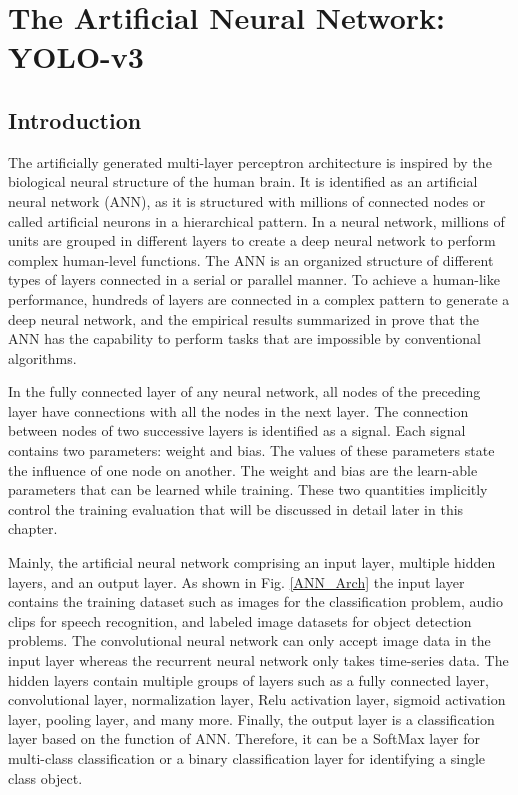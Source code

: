 \chapter{The Artificial Neural Network: YOLO-v3}
\label{ch:The Artificial Neural Network: YOLO-v3}

\section{Introduction}
The artificially generated multi-layer perceptron architecture is inspired by the biological neural structure of the human brain. It is identified as an artificial neural network (ANN), as it is structured with millions of connected nodes or called artificial neurons in a hierarchical pattern. In a neural network, millions of units are grouped in different layers to create a deep neural network to perform complex human-level functions. The ANN is an organized structure of different types of layers connected in a serial or parallel manner. To achieve a human-like performance, hundreds of layers are connected in a complex pattern to generate a deep neural network, and the empirical results summarized in \cite{goodfellow} prove that the ANN has the capability to perform tasks that are impossible by conventional algorithms.

In the fully connected layer of any neural network, all nodes of the preceding layer have connections with all the nodes in the next layer. The connection between nodes of two successive layers is identified as a signal. Each signal contains two parameters: weight and bias. The values of these parameters state the influence of one node on another. The weight and bias are the learn-able parameters that can be learned while training. These two quantities implicitly control the training evaluation that will be discussed in detail later in this chapter.

Mainly, the artificial neural network comprising an input layer, multiple hidden layers, and an output layer. As shown in Fig. \ref{ANN_Arch} the input layer contains the training dataset such as images for the classification problem, audio clips for speech recognition, and labeled image datasets for object detection problems. The convolutional neural network can only accept image data in the input layer whereas the recurrent neural network only takes time-series data. The hidden layers contain multiple groups of layers such as a fully connected layer, convolutional layer, normalization layer, Relu activation layer, sigmoid activation layer, pooling layer, and many more. Finally, the output layer is a classification layer based on the function of ANN. Therefore, it can be a SoftMax layer for multi-class classification or a binary classification layer for identifying a single class object.

